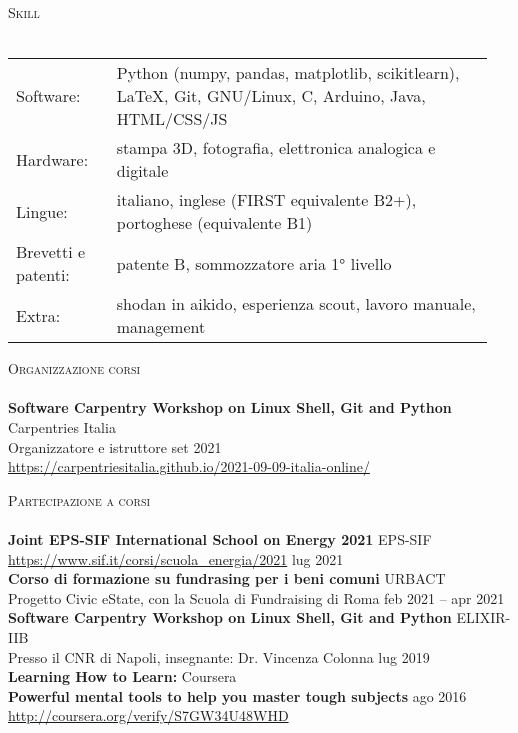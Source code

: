 \documentclass[a4paper]{article}
\newcommand{\lineunder} {
  \vspace*{-8pt} \\
  \hspace*{-18pt} \hrulefill \\
}
\newcommand{\header} [1] {
  {\hspace*{-18pt}\vspace*{6pt} \textsc{#1}}
  \vspace*{-6pt} \lineunder
}
\begin{document}
\header{Skill}
\begin{tabular}{ p{0.2\linewidth} p{0.75\linewidth} }
  Software: & Python (numpy, pandas, matplotlib, scikitlearn), LaTeX, Git, GNU/Linux,
              C, Arduino, Java, HTML/CSS/JS \\
  Hardware: & stampa 3D, fotografia, elettronica analogica e digitale \\
  Lingue: & italiano, inglese (FIRST equivalente B2+),
            portoghese (equivalente B1) \\
  Brevetti e patenti: & patente B, sommozzatore aria 1° livello \\
  Extra: & shodan in aikido, esperienza scout, lavoro manuale, management
\end{tabular}
\vspace{2mm}

\header{Organizzazione corsi}
\textbf{Software Carpentry Workshop on Linux Shell, Git and Python} \hfill Carpentries Italia\\
Organizzatore e istruttore \hfill set 2021 \\
\url{https://carpentriesitalia.github.io/2021-09-09-italia-online/} \\
\vspace*{2mm}

\header{Partecipazione a corsi}
\textbf{Joint EPS-SIF International School on Energy 2021} \hfill EPS-SIF \\
\url{https://www.sif.it/corsi/scuola_energia/2021} \hfill lug 2021 \\
\vspace*{2mm}
\textbf{Corso di formazione su fundrasing per i beni comuni} \hfill URBACT \\
Progetto Civic eState, con la Scuola di Fundraising di Roma \hfill feb 2021 -- apr 2021\\
\vspace*{2mm}
\textbf{Software Carpentry Workshop on Linux Shell, Git and Python} \hfill ELIXIR-IIB\\
Presso il CNR di Napoli, insegnante: Dr. Vincenza Colonna \hfill lug 2019\\
\vspace*{2mm}
\textbf{Learning How to Learn:} \hfill Coursera\\
\textbf{Powerful mental tools to help you master tough subjects} \hfill ago 2016\\
\url{http://coursera.org/verify/S7GW34U48WHD}\\
\vspace*{2mm}
\end{document}
